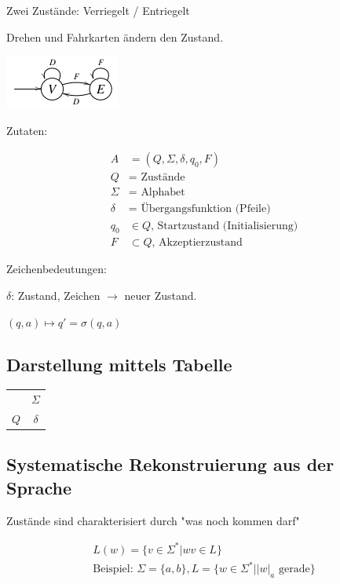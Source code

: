 	Zwei Zustände: Verriegelt / Entriegelt
	
	Drehen und Fahrkarten ändern den Zustand.
	
	\includegraphics[scale=0.5]{img/skilift.png}

Zutaten: 

\begin{align*}
	A	&= (Q, \Sigma, \delta, q_0, F)  \\
	Q	&= \text{ Zustände} \\
	\Sigma	&= \text{ Alphabet} \\
	\delta	&= \text{ Übergangsfunktion (Pfeile)} \\
	q_0	&\in Q \text{, Startzustand (Initialisierung)} \\
	F	&\subset Q \text{, Akzeptierzustand}
\end{align*}

Zeichenbedeutungen:

$\delta$: Zustand, Zeichen $\rightarrow$ neuer Zustand.

$(q, a) \mapsto q'=\sigma(q,a)$


\subsection{Darstellung mittels Tabelle}

\begin{tabular}{c c}
 & $\Sigma$ \\
$Q$	& $\delta$
\end{tabular}

\subsection{Systematische Rekonstruierung aus der Sprache}

Zustände sind charakterisiert durch "was noch kommen darf"

\begin{align*}
	L(w) = \{v \in \Sigma^\ast | wv \in L \} \\
	\text{Beispiel: } \Sigma = \{a, b \}, L=\{ w \in \Sigma^\ast | |w|_a \text{ gerade}\}
\end{align*}



